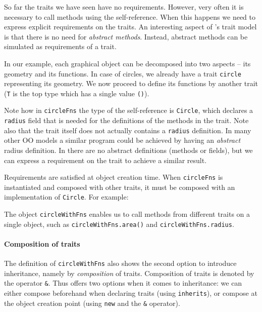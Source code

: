 So far the traits we have seen have no requirements. However, very often it is
necessary to call methods using the self-reference. When this happens
we need to express explicit requirements on the traits. An interesting aspect
of \name's trait model is that there is no need for \emph{abstract
  methods}. Instead, abstract methods can be simulated as requirements 
of a trait. 

In our example, each graphical object can be decomposed into two aspects -- its
geometry and its functions. In case of circles, we already have a trait
\lstinline{circle} representing its geometry. We now proceed to define its
functions by another trait (\lstinline{T} is the top type which has a single
value \lstinline{()}).

\noindent Note how in \lstinline$circleFns$ the type of the self-reference is
\lstinline$Circle$, which declares a \lstinline{radius} field that is needed for
the definitions of the methods in the trait. Note also that the trait itself
does not actually contains a \lstinline{radius} definition. In many other OO
models a similar program could be achieved by having an \emph{abstract} radius
definition. In \name there are no abstract definitions (methods or fields), but
we can express a requirement on the trait to achieve a similar result.

Requirements are satisfied at object creation time. When \lstinline$circleFns$
is instantiated and composed with other traits, it must be composed with an
implementation of \lstinline$Circle$. For example:

The object \lstinline{circleWithFns} enables us to call
methods from different traits on a single object, such as
\lstinline{circleWithFns.area()} and \lstinline{circleWithFns.radius}.

\paragraph{Composition of traits}
The definition of \lstinline{circleWithFns} also shows the second option to
introduce inheritance, namely by \textit{composition} of traits. Composition of
traits is denoted by the operator \lstinline{&}. Thus \name offers two options
when it comes to inheritance: we can either compose beforehand when declaring
traits (using \lstinline{inherits}), or compose at the object creation point
(using \lstinline{new} and the \lstinline{&} operator).

